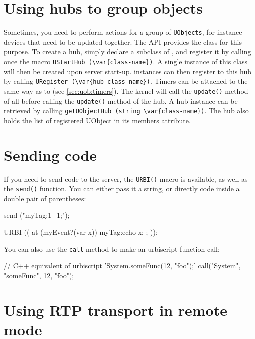 \section{Using hubs to group objects}

Sometimes, you need to perform actions for a group of \lstinline{UObjects},
for instance devices that need to be updated together. The API provides the
\UObjectHub class for this purpose. To create a hub, simply declare a
subclass of \UObjectHub, and register it by calling once the macro
\lstinline|UStartHub (\var{class-name})|. A single instance of this class
will then be created upon server start-up. \UObject instances can then
register to this hub by calling %
\lstinline|URegister (\var{hub-class-name})|. %
Timers can be attached to \UObjectHub the same way as to \UObject (see
\autoref{sec:uob:timers}). The kernel will call the \lstinline{update()}
method of all \UObject before calling the \lstinline{update()} method of the
hub. A hub instance can be retrieved by calling
\lstinline|getUObjectHub (string \var{class-name})|. The hub also holds the
list of registered UObject in its members attribute.

\section{Sending \us code}

If you need to send \us code to the server, the \lstinline{URBI()}
macro is available, as well as the \lstinline{send()} function. You
can either pass it a string, or directly \urbi code inside a double
pair of parentheses:

\begin{urbiunchecked}
send ("myTag:1+1;");

URBI (( at (myEvent?(var x)) { myTag:echo x; }; ));
\end{urbiunchecked}

You can also use the \lstinline{call} method to make an urbiscript function
call:

\begin{urbiunchecked}
// C++ equivalent of urbiscript 'System.someFunc(12, "foo");'
call("System", "someFunc", 12, "foo");
\end{urbiunchecked}

\section{Using RTP transport in remote mode}
\label{sec:uob:api:rtp}

